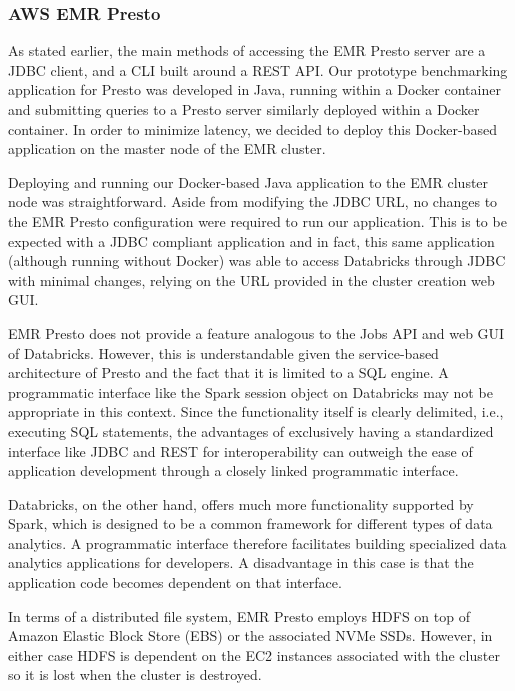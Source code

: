 \subsubsection{AWS EMR Presto}

As stated earlier, the main methods of accessing the EMR Presto server are a JDBC client, and a CLI built around a REST API. Our prototype benchmarking application for Presto was developed in Java, running within a Docker container and submitting queries to a Presto server similarly deployed within a Docker container. In order to minimize latency, we decided to deploy this Docker-based application on the master node of the EMR cluster.

Deploying and running our Docker-based Java application to the EMR cluster node was straightforward. Aside from modifying the JDBC URL, no changes to the EMR Presto configuration were required to run our application. This is to be expected with a JDBC compliant application and in fact, this same application (although running without Docker) was able to access Databricks through JDBC with minimal changes, relying on the URL provided in the cluster creation web GUI.

EMR Presto does not provide a feature analogous to the Jobs API and web GUI of Databricks. However, this is understandable given the service-based architecture of Presto and the fact that it is limited to a SQL engine. A programmatic interface like the Spark session object on Databricks may not be appropriate in this context. Since the functionality itself is clearly delimited, i.e., executing SQL statements, the advantages of exclusively having a standardized interface like JDBC and REST for interoperability can outweigh the ease of application development through a closely linked programmatic interface.

Databricks, on the other hand, offers much more functionality supported by Spark, which is designed to be a common framework for different types of data analytics. A programmatic interface therefore facilitates building specialized data analytics applications for developers. A disadvantage in this case is that the application code becomes dependent on that interface.

In terms of a distributed file system, EMR Presto employs HDFS on top of Amazon Elastic Block Store (EBS) or the associated NVMe SSDs. However, in either case HDFS is dependent on the EC2 instances associated with the cluster so it is lost when the cluster is destroyed.

